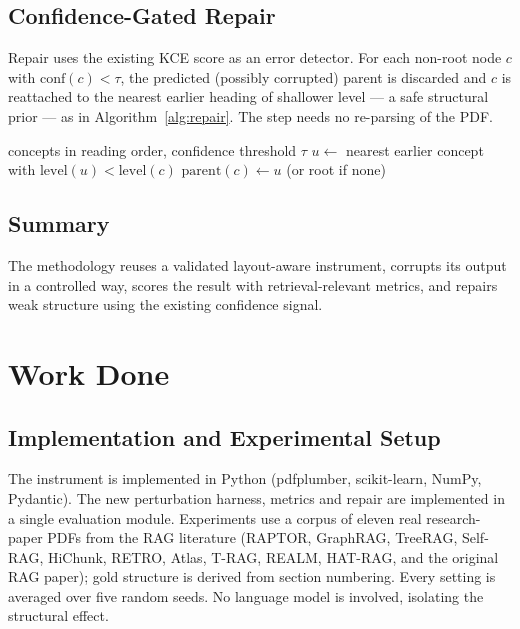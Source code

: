 \documentclass[12pt,a4paper]{report}
\begin{document}
\section{Confidence-Gated Repair}
Repair uses the existing KCE score as an error detector. For each non-root node $c$ with
$\mathrm{conf}(c) < \tau$, the predicted (possibly corrupted) parent is discarded and $c$ is
reattached to the nearest earlier heading of shallower level --- a safe structural prior --- as in
Algorithm~\ref{alg:repair}. The step needs no re-parsing of the PDF.

\begin{algorithm}[!htbp]
\caption{Confidence-Gated Structural Repair}\label{alg:repair}
\begin{algorithmic}[1]
\REQUIRE concepts in reading order, confidence threshold $\tau$
    \STATE $u \leftarrow$ nearest earlier concept with $\mathrm{level}(u) < \mathrm{level}(c)$
    \STATE $\mathrm{parent}(c) \leftarrow u$ (or root if none)
  \ENDIF
\ENDFOR
\end{algorithmic}
\end{algorithm}

\section{Summary}
The methodology reuses a validated layout-aware instrument, corrupts its output in a controlled way,
scores the result with retrieval-relevant metrics, and repairs weak structure using the existing
confidence signal.

\chapter{Work Done}

\section{Implementation and Experimental Setup}
The instrument is implemented in Python (pdfplumber, scikit-learn, NumPy, Pydantic). The new
perturbation harness, metrics and repair are implemented in a single evaluation module. Experiments
use a corpus of eleven real research-paper PDFs from the RAG literature (RAPTOR, GraphRAG, TreeRAG,
Self-RAG, HiChunk, RETRO, Atlas, T-RAG, REALM, HAT-RAG, and the original RAG paper); gold structure
is derived from section numbering. Every setting is averaged over five random seeds. No language
model is involved, isolating the structural effect.
\end{document}
